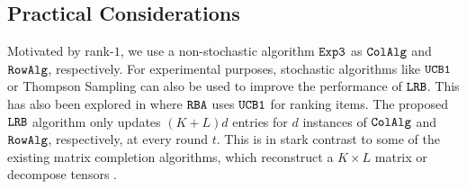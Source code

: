 \subsection{Practical Considerations}
\label{sec:practical considerations}
Motivated by rank-$1$, we use a non-stochastic algorithm ${\tt Exp3}$ as ${\tt ColAlg}$ and ${\tt RowAlg}$, respectively. For experimental purposes, stochastic algorithms like ${\tt UCB1}$ or Thompson Sampling can also be used to improve the performance of ${\tt LRB}$. This has also been explored in \citet{radlinski2008learning} where ${\tt RBA}$ uses ${\tt UCB1}$ for ranking items. The proposed ${\tt LRB}$ algorithm only updates $(K + L)d$ entries for $d$ instances of ${\tt ColAlg}$ and ${\tt RowAlg}$, respectively, at every round $t$. This is in stark contrast to some of the existing matrix completion algorithms, which reconstruct a $K\times L$ matrix \citep{sen2016contextual} or decompose tensors \citep{gopalan2016low}. 

